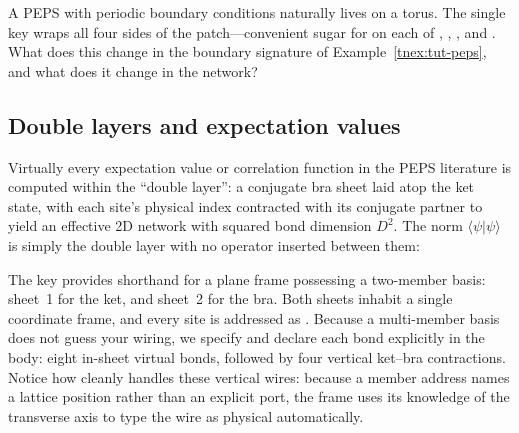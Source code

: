  A PEPS with periodic boundary conditions naturally
lives on a torus.  The single key  wraps all four
sides of the patch---convenient sugar for  on each of
, , , and .  What does
this change in the boundary signature of Example~\ref{tnex:tut-peps}, and what
does it change in the network?

\subsection{Double layers and expectation values}

Virtually every expectation value or correlation function in the PEPS
literature is computed within the ``double layer'': a conjugate bra sheet laid
atop the ket state, with each site's physical index contracted with its conjugate
partner to yield an effective 2D network with squared bond dimension $D^2$.  The
norm $\langle\psi|\psi\rangle$ is simply the double layer with no operator
inserted between them:

\begin{tnexample}[
  label={tnex:tut-doublelayer},
  formula={\langle\psi|\psi\rangle},
  caption={the norm as a double layer},
  index={Two $2\times2$ sheets in one frame: $A$ marks the ket sheet,
    $\overline{A}$ the bra copy above it.  Each short diagonal is one
    ket--bra physical contraction; nothing stays open, and the empty
    signature says scalar.},
  signature={kernel-boundary|signature=}]
\begin{tenkz}[lattice={2x2}, planes, bonds=none]
   
   
   
   
   
   
\end{tenkz}
\end{tnexample}

The key  provides shorthand for a plane frame possessing a
two-member basis: sheet~1 for the ket, and sheet~2 for the bra.  Both sheets
inhabit a single coordinate frame, and every site is addressed as
.  Because a multi-member basis does not guess your wiring,
we specify  and declare each bond explicitly in the
body: eight in-sheet virtual bonds, followed by four vertical ket--bra
contractions.  Notice how cleanly \pkg{} handles these vertical wires: because
a member address names a lattice position rather than an explicit port, the
frame uses its knowledge of the transverse axis to type the wire as physical
automatically.

